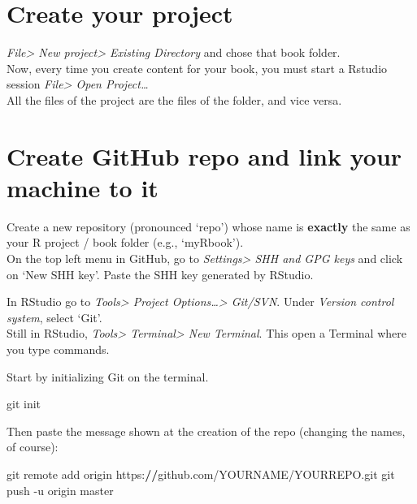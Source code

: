 \documentclass[]{book}
\newenvironment{Shaded}{}{}
\newcommand{\ErrorTok}[1]{\textcolor[rgb]{1.00,0.00,0.00}{\textbf{#1}}}
\newcommand{\NormalTok}[1]{#1}
\newcommand{\OperatorTok}[1]{\textcolor[rgb]{0.40,0.40,0.40}{#1}}
\theoremstyle{definition}
\theoremstyle{definition}
\theoremstyle{definition}
\theoremstyle{remark}
\begin{document}
\hypertarget{create-your-project}{%
\section{Create your project}\label{create-your-project}}

\emph{File\textgreater{} New project\textgreater{} Existing Directory}
and chose that book folder.\\
Now, every time you create content for your book, you must start a
Rstudio session \emph{File\textgreater{} Open Project\ldots{}}\\
All the files of the project are the files of the folder, and vice
versa.

\hypertarget{create-github-repo-and-link-your-machine-to-it}{%
\section{Create GitHub repo and link your machine to
it}\label{create-github-repo-and-link-your-machine-to-it}}

Create a new repository (pronounced `repo') whose name is
\textbf{exactly} the same as your R project / book folder (e.g.,
`myRbook').\\
On the top left menu in GitHub, go to \emph{Settings\textgreater{} SHH
and GPG keys} and click on `New SHH key'. Paste the SHH key generated by
RStudio.

In RStudio go to \emph{Tools\textgreater{} Project
Options\ldots\textgreater{} Git/SVN}. Under \emph{Version control
system}, select `Git'.\\
Still in RStudio, \emph{Tools\textgreater{} Terminal\textgreater{} New
Terminal}. This open a Terminal where you type commands.

Start by initializing Git on the terminal.

\begin{Shaded}
\begin{Highlighting}[]
\NormalTok{git init}
\end{Highlighting}
\end{Shaded}

Then paste the message shown at the creation of the repo (changing the
names, of course):

\begin{Shaded}
\begin{Highlighting}[]
\NormalTok{git remote add origin https}\OperatorTok{:}\ErrorTok{//}\NormalTok{github.com}\OperatorTok{/}\NormalTok{YOURNAME}\OperatorTok{/}\NormalTok{YOURREPO.git}
\NormalTok{git push }\OperatorTok{-}\NormalTok{u origin master}
\end{Highlighting}
\end{Shaded}
\end{document}
